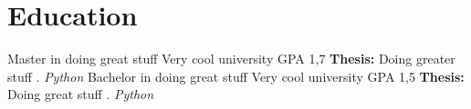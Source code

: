 
\section{Education}

{Master in doing great stuff}
{Very cool university}
{}
{GPA 1,7}
{\textbf{Thesis:}
	\glqq Doing greater stuff  \grqq.
	\emph{Python }
}
{Bachelor in doing great stuff}
{Very cool university}
{}
{GPA 1,5}
{\textbf{Thesis:}
	\glqq Doing great stuff  \grqq.
	\emph{Python }
}

